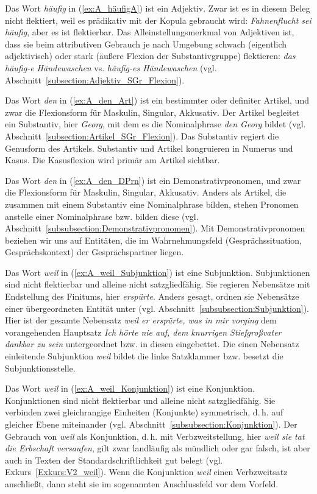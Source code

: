 Das Wort \textit{häufig} in (\ref{ex:A_häufigA}) ist ein Adjektiv. Zwar ist es in diesem Beleg nicht flektiert, weil es prädikativ mit der Kopula gebraucht wird: \textit{Fahnenflucht sei häufig}, aber es ist flektierbar. Das Alleinstellungsmerkmal von Adjektiven ist, dass sie beim attributiven Gebrauch je nach Umgebung schwach (eigentlich adjektivisch) oder stark (äußere Flexion der Substantivgruppe) flektieren: \textit{das häufig-e Händewaschen} vs. \textit{häufig-es Händewaschen} (vgl. Abschnitt~\ref{subsection:Adjektiv_SGr_Flexion}). 

Das Wort \textit{den} in (\ref{ex:A_den_Art}) ist ein bestimmter oder definiter Artikel, und zwar die Flexionsform für Maskulin, Singular, Akkusativ. Der Artikel begleitet ein Substantiv, hier \textit{Georg}, mit dem es die Nominalphrase \textit{den Georg} bildet (vgl. Abschnitt~\ref{subsection:Artikel_SGr_Flexion}). Das Substantiv regiert die Genusform des Artikels. Substantiv und Artikel kongruieren in Numerus und Kasus. Die Kasusflexion wird primär am Artikel sichtbar. 

Das Wort \textit{den} in (\ref{ex:A_den_DPrn}) ist ein Demonstrativpronomen, und zwar die Flexionsform für Maskulin, Singular, Akkusativ. Anders als Artikel, die zusammen mit einem Substantiv eine Nominalphrase bilden, stehen Pronomen anstelle einer Nominalphrase bzw. bilden diese (vgl. Abschnitt~\ref{subsubsection:Demonstrativpronomen}). Mit Demonstrativpronomen beziehen wir uns auf Entitäten, die im Wahrnehmungsfeld (Gesprächssituation, Gesprächskontext) der Gesprächspartner liegen. 

Das Wort \textit{weil} in (\ref{ex:A_weil_Subjunktion}) ist eine Subjunktion. Subjunktionen sind nicht flektierbar und alleine nicht satzgliedfähig. Sie regieren Nebensätze mit Endstellung des Finitums, hier \textit{erspürte}. Anders gesagt, ordnen sie Nebensätze einer übergeordneten Entität unter (vgl. Abschnitt~\ref{subsubsection:Subjunktion}). Hier ist der gesamte Nebensatz \textit{weil er erspürte, was in mir vorging} dem vorangehenden Hauptsatz \textit{Ich hörte nie auf, dem knurrigen Stiefgroßvater dankbar zu sein} untergeordnet bzw. in diesen eingebettet. Die einen Nebensatz einleitende Subjunktion \textit{weil} bildet die linke Satzklammer bzw. besetzt die Subjunktionsstelle.

Das Wort \textit{weil} in (\ref{ex:A_weil_Konjunktion}) ist eine Konjunktion. Konjunktionen sind nicht flektierbar und alleine nicht satzgliedfähig. Sie verbinden zwei gleichrangige Einheiten (Konjunkte) symmetrisch, d.\,h. auf gleicher Ebene miteinander (vgl. Abschnitt~\ref{subsubsection:Konjunktion}). Der Gebrauch von \textit{weil} als Konjunktion, d.\,h. mit Verbzweitstellung, hier \textit{weil sie tat die Erbschaft versaufen}, gilt zwar landläufig als mündlich oder gar falsch, ist aber auch in Texten der Standardschriftlichkeit gut belegt (vgl. Exkurs~\ref{Exkurs:V2_weil}). Wenn die Konjunktion \textit{weil} einen Verbzweitsatz anschließt, dann steht sie im sogenannten Anschlussfeld vor dem Vorfeld. 

